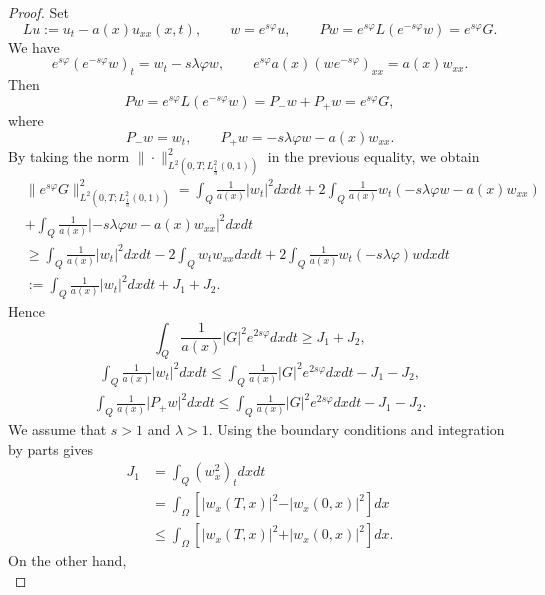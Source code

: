 \documentclass[reqno]{amsart}
\theoremstyle{plain}
\theoremstyle{remark}
\numberwithin{equation}{section}
\begin{document}
\begin{proof}
Set 
$$ Lu :=u_{t} - a(x)  u_{xx}(x,t), \qquad w=e^{s\varphi}u, \qquad Pw=e^{s\varphi}L\left(e^{-s\varphi}w\right)= e^{s\varphi} G.$$
We have $$ e^{s\varphi} \left(e^{-s\varphi}w\right)_{t}=w_{t} -s\lambda \varphi w, \qquad e^{s\varphi} a(x) \left(w e^{-s\varphi}\right)_{xx}=a(x)w_{xx}.$$
Then $$ Pw= e^{s\varphi}L\left(e^{-s\varphi}w\right)= P_{-}w+P_{+}w =e^{s\varphi} G,$$
   where 
   $$P_{-}w= w_{t}, \qquad P_{+}w = -s\lambda \varphi w -a(x)w_{xx}.$$
   By taking the norm $\| \cdot\|^2_{L^2(0,T;L^2_{\frac{1}{a}}(0,1))}$ in the previous equality, we obtain
\begin{align*}
&\| e^{s\varphi}G\|^2_{L^2(0,T;L^2_{\frac{1}{a}}(0,1))}=\int_{Q} \frac{1}{a(x)}\vert w_{t}\vert^2 dx dt + 2 \int_{Q} \frac{1}{a(x)}w_{t} \left(-s\lambda \varphi w -a(x)w_{xx} \right)\\
& +\int_{Q}\frac{1}{a(x)}\left\vert - s\lambda \varphi w -a(x)w_{xx} \right\vert^2dxdt\\
& \geqslant \int_{Q}\frac{1}{a(x)} \vert w_{t}\vert^2dxdt - 2 \int_{Q}w_{t}w_{xx} dx dt+2 \int_{Q}\frac{1}{a(x)}w_{t}  (-s\lambda\varphi)wdxdt\\
&:= \int_{Q} \frac{1}{a(x)}\vert w_{t}\vert^2dxdt+ J_{1}+J_{2}.
\end{align*}
Hence 
$$ \int_{Q}\frac{1}{a(x)}\vert G\vert^2 e^{2s\varphi}dx dt\geqslant J_{1}+J_{2},$$
\begin{align}\label{2}
    \int_{Q}\frac{1}{a(x)} \vert w_{t}\vert^2dxdt \leqslant \int_{Q}\frac{1}{a(x)}\vert G\vert^2 e^{2s\varphi}dx dt -J_{1}-J_{2},
\end{align}
\begin{align*}
    \int_{Q}\frac{1}{a(x)} \vert P_{+}w\vert^2dxdt \leqslant \int_{Q}\frac{1}{a(x)}\vert G\vert^2 e^{2s\varphi}dx dt -J_{1}-J_{2}.
\end{align*}
We assume that $s>1$ and $\lambda>1.$
Using the boundary conditions and integration by parts gives
\begin{equation}\label{3}
    \begin{aligned}
    J_{1}&=\int_{Q}(w_{x}^2)_{t}dx dt\\
    &= \int_{\Omega}\left[\vert w_{x}(T,x)\vert^2- \vert w_{x}(0,x)\vert^2\right] dx\\ &\leqslant  \int_{\Omega}\left[\vert w_{x}(T,x)\vert^2+\vert w_{x}(0,x)\vert^2\right] dx.
    \end{aligned}
\end{equation}
On the other hand,
\begin{equation}\label{4}

\end{equation}
\end{proof}
\end{document}
